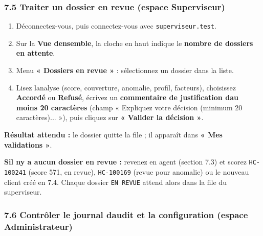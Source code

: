\documentclass[
  french,
  11pt,
  a4paper,
]{article}
\providecommand{\tightlist}{%
  \setlength{\itemsep}{0pt}\setlength{\parskip}{0pt}}
\begin{document}
\subsubsection{7.5 Traiter un dossier en revue (espace
Superviseur)}\label{75-traiter-un-dossier-en-revue-espace-superviseur}

\begin{enumerate}
\def\labelenumi{\arabic{enumi}.}
\tightlist
\item
  Déconnectez-vous, puis connectez-vous avec
  \texttt{superviseur.\allowbreak{}test}.
\item
  Sur la \textbf{Vue d\textquotesingle ensemble}, la cloche en haut
  indique le \textbf{nombre de dossiers en attente}.
\item
  Menu \textbf{« Dossiers en revue »} : sélectionnez un dossier dans la
  liste.
\item
  Lisez l\textquotesingle analyse (score, couverture, anomalie, profil,
  facteurs), choisissez \textbf{Accordé} ou \textbf{Refusé}, écrivez un
  \textbf{commentaire de justification d\textquotesingle au moins 20
  caractères} (champ « Expliquez votre décision (minimum 20
  caractères)... »), puis cliquez sur \textbf{« Valider la décision »}.
\end{enumerate}

\textbf{Résultat attendu :} le dossier quitte la file ; il apparaît dans
\textbf{« Mes validations »}.

\textbf{S\textquotesingle il n\textquotesingle y a aucun dossier en
revue :} revenez en agent (section 7.3) et scorez \texttt{HC-100241}
(score 571, en revue), \texttt{HC-100169} (revue pour anomalie) ou le
nouveau client créé en 7.4. Chaque dossier \texttt{EN\ REVUE} attend
alors dans la file du superviseur.

\subsubsection{7.6 Contrôler le journal d\textquotesingle audit et la
configuration (espace
Administrateur)}\label{76-contruxf4ler-le-journal-daudit-et-la-configuration-espace-administrateur}
\end{document}
